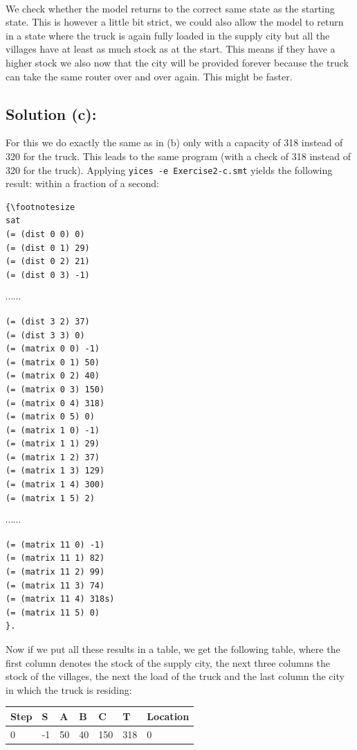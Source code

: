 \documentclass[12pt]{article}
\begin{document}
{\\
We check whether the model returns to the correct same state as the starting state. This is however a little bit strict, we could also allow the model to return in a state where the truck is again fully loaded in the supply city but all the villages have at least as much stock as at the start. This means if they have a higher stock we also now that the city will be provided forever because the truck can take the same router over and over again. This might be faster.

\vspace{3mm}

\subsection*{Solution (c):}
For this we do exactly the same as in (b) only with a capacity of 318 instead of 320 for the truck. This leads to the same program (with a check of 318 instead of 320 for the truck). Applying {\tt yices -e Exercise2-c.smt} yields the following result:
within a fraction of a second:
\begin{verbatim}
{\footnotesize
sat
(= (dist 0 0) 0)
(= (dist 0 1) 29)
(= (dist 0 2) 21)
(= (dist 0 3) -1)
\end{verbatim}
$\cdots \cdots$ 
\begin{verbatim}
(= (dist 3 2) 37)
(= (dist 3 3) 0)
(= (matrix 0 0) -1)
(= (matrix 0 1) 50)
(= (matrix 0 2) 40)
(= (matrix 0 3) 150)
(= (matrix 0 4) 318)
(= (matrix 0 5) 0)
(= (matrix 1 0) -1)
(= (matrix 1 1) 29)
(= (matrix 1 2) 37)
(= (matrix 1 3) 129)
(= (matrix 1 4) 300)
(= (matrix 1 5) 2)
\end{verbatim}
$\cdots \cdots$ 
\begin{verbatim}
(= (matrix 11 0) -1)
(= (matrix 11 1) 82)
(= (matrix 11 2) 99)
(= (matrix 11 3) 74)
(= (matrix 11 4) 318s)
(= (matrix 11 5) 0)
}.
\end{verbatim}
\noindent Now if we put all these results in a table, we get the following table, where the first column denotes the stock of the supply city, the next three columns the stock of the villages, the next the load of the truck and the last column the city in which the truck is residing:\\
\begin{center}
\begin{tabular}{| l | l | l | l | l | l | l |}
\hline
Step 	& S	& A	& B	& C 	& T 	& Location\\
\hline
0	& 	-1	&	50	&	40 	&	150	&	318	&	0	\\

\end{tabular}
\end{center}}
\end{document}
